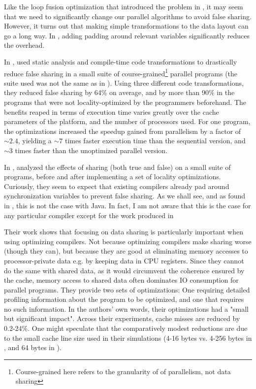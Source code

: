Like the loop fusion optimization that introduced the problem in \cite{mystery},
it may seem that we need to significantly change our parallel algorithms to
avoid false sharing. However, it turns out that making simple transformations to
the data layout can go a long way. In \cite{mystery}, adding padding around
relevant variables significantly reduces the overhead.

In \citeyear{eggersReducing}, \citeauthor{eggersReducing} used static analysis
and compile-time code transformations to drastically reduce false sharing in a
small suite of course-grained\footnote{Course-grained here refers to the
granularity of of parallelism, not data sharing} parallel programs
\cite{eggersReducing} (the suite used was not the same as in \cite{eggersbus}).
Using three different code transformations, they reduced false sharing by 64\%
on average, and by more than 90\% in the programs that were not
locality-optimized by the programmers beforehand. The benefits reaped in terms
of execution time varies greatly over the cache parameters of the platform, and
the number of processors used. For one program, the optimizations increased the
speedup gained from parallelism by a factor of $\sim 2.4$, yielding a $\sim 7$
times faster execution time than the sequential version, and $\sim 3$ times
faster than the unoptimized parallel version.

In \citeyear{TorrellasShared}, \citeauthor{TorrellasShared}
\cite{TorrellasShared} analyzed the effects of sharing (both true and false)
on a small suite of programs, before and after implementing a set of locality
optimizations. Curiously, they seem to expect that existing compilers already
pad around synchronization variables to prevent false sharing. As we shall see,
and as found in \cite{mystery}, this is not the case with Java. In fact, I am
not aware that this is the case for any particular compiler except for the work
produced in \cite{eggersReducing}

Their work \cite{TorrellasShared} shows that focusing on data sharing is
particularly important when using optimizing compilers. Not because optimizing
compilers make sharing worse (though they can), but because they are good at
eliminating memory accesses to processor-private data e.g. by keeping data in
CPU registers. Since they cannot do the same with shared data, as it would
circumvent the coherence ensured by the cache, memory access to shared data
often dominates IO consumption for parallel programs. They provide two sets of
optimizations: One requiring detailed profiling information about the program to
be optimized, and one that requires no such information. In the authors' own
words, their optimizations had a "small but significant impact". Across their
experiments, cache misses are reduced by 0.2-24\%. One might speculate that the
comparatively modest reductions are due to the small cache line size used in
their simulations (4-16 bytes vs. 4-256 bytes in \cite{eggersReducing}, and 64
bytes in \cite{mystery}).

